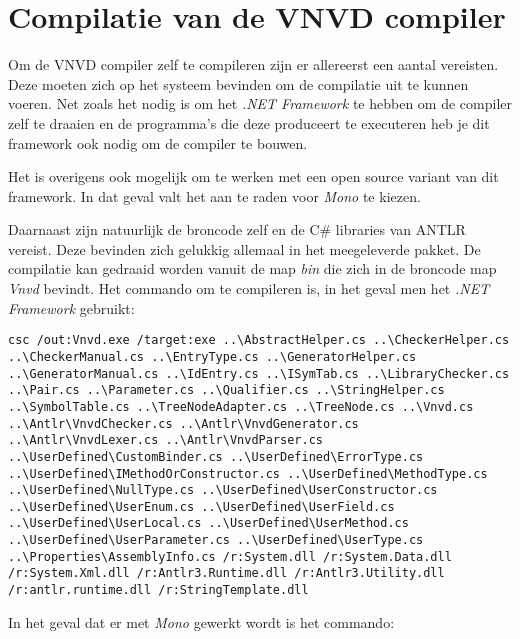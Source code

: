 \section{Compilatie van de VNVD compiler}
Om de VNVD compiler zelf te compileren zijn er allereerst een aantal vereisten. Deze moeten zich op het systeem bevinden om de compilatie uit te kunnen voeren. Net zoals het nodig is om het \textit{.NET Framework} te hebben om de compiler zelf te draaien en de programma's die deze produceert te executeren heb je dit framework ook nodig om de compiler te bouwen.

Het is overigens ook mogelijk om te werken met een open source variant van dit framework. In dat geval valt het aan te raden voor \textit{Mono} te kiezen.

Daarnaast zijn natuurlijk de broncode zelf en de C\# libraries van ANTLR vereist. Deze bevinden zich gelukkig allemaal in het meegeleverde pakket. De compilatie kan gedraaid worden vanuit de map \textit{bin} die zich in de broncode map \textit{Vnvd} bevindt. Het commando om te compileren is, in het geval men het \textit{.NET Framework} gebruikt:

\begin{lstlisting}
csc /out:Vnvd.exe /target:exe ..\AbstractHelper.cs ..\CheckerHelper.cs ..\CheckerManual.cs ..\EntryType.cs ..\GeneratorHelper.cs ..\GeneratorManual.cs ..\IdEntry.cs ..\ISymTab.cs ..\LibraryChecker.cs ..\Pair.cs ..\Parameter.cs ..\Qualifier.cs ..\StringHelper.cs ..\SymbolTable.cs ..\TreeNodeAdapter.cs ..\TreeNode.cs ..\Vnvd.cs ..\Antlr\VnvdChecker.cs ..\Antlr\VnvdGenerator.cs ..\Antlr\VnvdLexer.cs ..\Antlr\VnvdParser.cs ..\UserDefined\CustomBinder.cs ..\UserDefined\ErrorType.cs ..\UserDefined\IMethodOrConstructor.cs ..\UserDefined\MethodType.cs ..\UserDefined\NullType.cs ..\UserDefined\UserConstructor.cs ..\UserDefined\UserEnum.cs ..\UserDefined\UserField.cs ..\UserDefined\UserLocal.cs ..\UserDefined\UserMethod.cs ..\UserDefined\UserParameter.cs ..\UserDefined\UserType.cs ..\Properties\AssemblyInfo.cs /r:System.dll /r:System.Data.dll /r:System.Xml.dll /r:Antlr3.Runtime.dll /r:Antlr3.Utility.dll /r:antlr.runtime.dll /r:StringTemplate.dll
\end{lstlisting}

In het geval dat er met \textit{Mono} gewerkt wordt is het commando:


